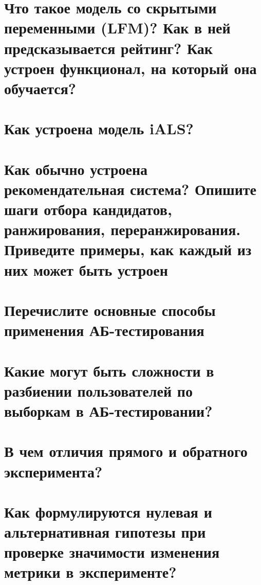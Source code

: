 \documentclass[14pt]{extarticle}
\begin{document}
	\section{Что такое модель со скрытыми переменными (LFM)? Как в ней предсказывается рейтинг? Как устроен функционал, на который она обучается?} %
	
	
	\newpage
	
	\section{Как устроена модель iALS?} 
	
	
	\newpage
	
	\section{Как обычно устроена рекомендательная система? Опишите шаги отбора кандидатов, ранжирования, переранжирования. Приведите примеры, как каждый из них может быть устроен} 
	
	
	\newpage
	
	\section{Перечислите основные способы применения АБ-тестирования} 
	
	
	\newpage
	
	\section{Какие могут быть сложности в разбиении пользователей по выборкам в АБ-тестировании?} 
	
	
	\newpage
	
	\section{В чем отличия прямого и обратного эксперимента?} 
	
	
	\newpage
	
	\section{Как формулируются нулевая и альтернативная гипотезы при проверке значимости изменения метрики в эксперименте?} 
	
	
\end{document}
